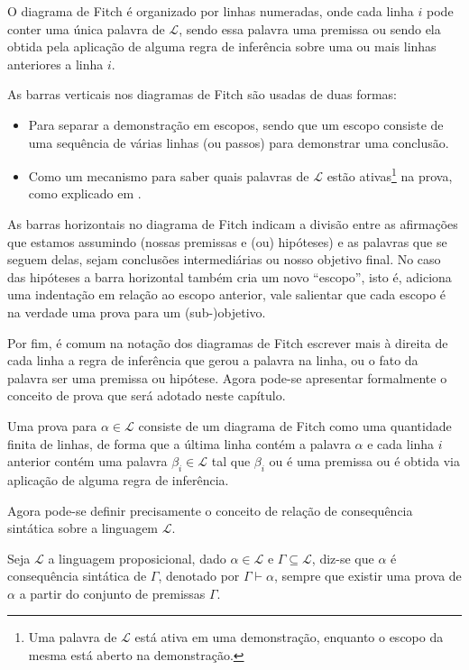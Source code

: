 O diagrama de Fitch é organizado por linhas numeradas, onde cada linha $i$ pode conter uma única palavra de $\mathcal{L}$, sendo essa palavra uma premissa ou sendo ela obtida pela aplicação de alguma regra de inferência sobre uma ou mais linhas anteriores a linha $i$. 

As barras verticais nos diagramas de Fitch são usadas de duas formas:
\begin{itemize}
    \item[(1)] Para separar a demonstração em escopos, sendo que um escopo consiste de uma sequência de várias linhas (ou passos) para demonstrar uma conclusão.
    \item[(2)] Como um mecanismo para saber quais palavras de $\mathcal{L}$ estão ativas\footnote{Uma palavra de $\mathcal{L}$ está ativa em uma demonstração, enquanto o escopo da mesma está aberto na demonstração.} na prova, como explicado em \cite{joaoPavao2014}. 
\end{itemize}

As barras horizontais no diagrama de Fitch indicam a divisão entre  as  afirmações  que  estamos  assumindo  (nossas premissas e (ou) hipóteses) e as palavras que se seguem delas, sejam conclusões intermediárias ou nosso objetivo final. No caso das hipóteses a barra horizontal também cria um novo ``escopo'', isto é, adiciona uma indentação em relação ao escopo anterior, vale salientar que cada escopo é na verdade uma prova para um (sub-)objetivo. 

Por fim, é comum na notação dos diagramas de Fitch escrever mais à direita de cada linha a regra de inferência que gerou a palavra na linha, ou o fato da palavra ser uma premissa ou hipótese. Agora pode-se apresentar formalmente o conceito de prova que será adotado neste capítulo.

\begin{definicao}[Prova]\label{def:Prova}
  Uma prova para $\alpha \in \mathcal{L}$ consiste de um diagrama de Fitch como uma quantidade finita de linhas, de forma que a última linha contém a palavra $\alpha$ e cada linha $i$ anterior contém uma palavra $\beta_i \in \mathcal{L}$ tal que $\beta_i$ ou é uma premissa ou é obtida via aplicação de alguma regra de inferência.
\end{definicao}

Agora pode-se definir precisamente o conceito de relação de consequência sintática sobre a linguagem $\mathcal{L}$.

\begin{definicao}\label{def:ConsequênciaSintatica}
  Seja $\mathcal{L}$ a linguagem proposicional, dado $\alpha \in \mathcal{L}$ e $\Gamma \subseteq \mathcal{L}$, diz-se que $\alpha$ é consequência sintática de $\Gamma$, denotado por $\Gamma \vdash \alpha$, sempre que existir uma prova de $\alpha$ a partir do conjunto de premissas $\Gamma$. 
\end{definicao}

